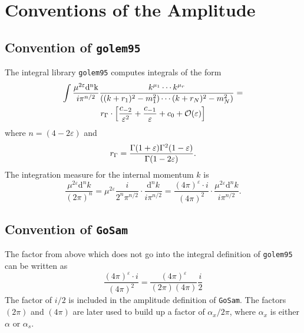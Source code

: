 \documentclass[11pt,a4paper]{refrep}
\newcommand{\golemversion}{{1{.}0}}
\newcommand{\golemv}[1][\golemversion]{{\tt GoSam}\xspace}
\newcommand{\golemVC}{{\tt golem95}\xspace}
\begin{document}

\appendix

\chapter{Conventions of the Amplitude}

\section{Convention of \golemVC}
The integral library \golemVC{} computes integrals of the form
\begin{multline}
\int\frac{\mu^{2\varepsilon}\mathrm{d^nk}}{i\pi^{n/2}}\frac{k^{\mu_1}\cdots k^{\mu_r}}{%
((k+r_1)^2-m_1^2)\cdots(k+r_N)^2-m_N^2)}=\\
r_\Gamma\cdot\left[\frac{c_{-2}}{\varepsilon^2}+\frac{c_{-1}}{\varepsilon}+c_0
+{\mathcal{O}}(\varepsilon)\right]
\end{multline}
where $n=(4-2\varepsilon)$ and
\begin{equation}
r_\Gamma=\frac{\Gamma(1+\varepsilon)\Gamma^2(1-\varepsilon)}{%
   \Gamma(1-2\varepsilon)}.
\end{equation}
The integration measure for the internal momentum $k$ is
\begin{equation}
\frac{\mu^{2\varepsilon}\mathrm{d}^nk}{(2\pi)^n}
=\mu^{2\varepsilon}\frac{i}{2^n\pi^{n/2}}\cdot\frac{{\mathrm d}^nk}{i\pi^{n/2}}
=\frac{(4\pi)^\varepsilon \cdot i}{(4\pi)^2}\cdot%
 \frac{\mu^{2\varepsilon}{\mathrm d}^nk}{i\pi^{n/2}}.
\end{equation}

\section{Convention of \golemv}
The factor from above which does not go into the integral definition of
\golemVC{} can be written as
\begin{equation}
\frac{(4\pi)^\varepsilon \cdot i}{(4\pi)^2}=
\frac{(4\pi)^\varepsilon}{(2\pi)(4\pi)}\frac{i}{2}
\end{equation}
The factor of $i/2$ is included in the amplitude definition of \golemv{}.
The factors $(2\pi)$ and $(4\pi)$ are later used to build up a factor of
$\alpha_x/2\pi$, where $\alpha_x$ is either $\alpha$ or $\alpha_s$.
\end{document}
